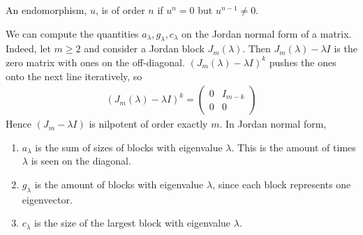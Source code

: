 \begin{definition}[Nilpotent]
	An endomorphism, $u$, is  of order $n$ if $u^n = 0$ but $u^{n-1} \neq 0$.
\end{definition} 

\begin{remark}
	We can compute the quantities $a_\lambda, g_\lambda, c_\lambda$ on the Jordan normal form of a matrix.
	Indeed, let $m \geq 2$ and consider a Jordan block $J_m(\lambda)$.
	Then $J_m(\lambda) - \lambda I$ is the zero matrix with ones on the off-diagonal.
	$(J_m(\lambda) - \lambda I)^k$ pushes the ones onto the next line iteratively, so
	\begin{align*}
		(J_m(\lambda) - \lambda I)^k = \begin{pmatrix}
			0 & I_{m-k} \\
			0 & 0
		\end{pmatrix}
	\end{align*}
	Hence $(J_m - \lambda I)$ is nilpotent of order exactly $m$.
	In Jordan normal form,
	\begin{enumerate}
		\item $a_\lambda$ is the sum of sizes of blocks with eigenvalue $\lambda$.
		      This is the amount of times $\lambda$ is seen on the diagonal.
		\item $g_\lambda$ is the amount of blocks with eigenvalue $\lambda$, since each block represents one eigenvector.
		\item $c_\lambda$ is the size of the largest block with eigenvalue $\lambda$.
	\end{enumerate}
\end{remark}

